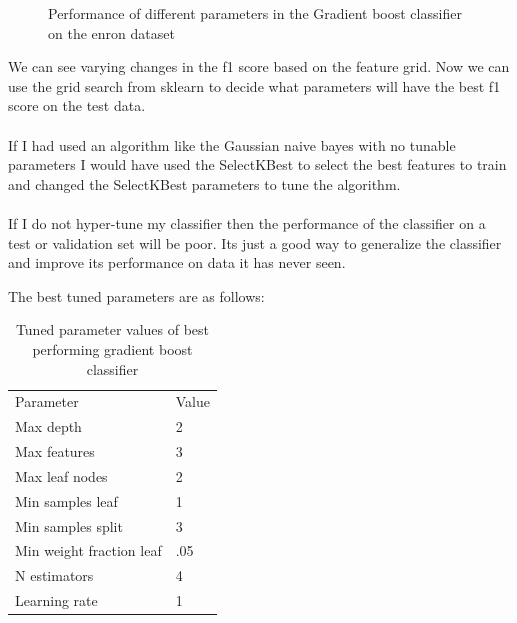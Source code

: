 \documentclass[12pt]{article}%
\begin{document}
\begin{figure}[!htbp]
\centering
  \caption{Performance of different parameters in the Gradient boost classifier on the enron dataset}
\end{figure}
We can see varying changes in the f1 score based on the feature grid. Now we can use the grid search from sklearn to decide what parameters will have the best f1 score on the test data.
\\
\\
If I had used an algorithm like the Gaussian naive bayes with no tunable parameters I would have used the SelectKBest to select the best features to train and changed the SelectKBest parameters to tune the algorithm.
\\
\\
If I do not hyper-tune my classifier then the performance of the classifier on a test or validation set will be poor. Its just a good way to generalize the classifier and improve its performance on data it has never seen.

The best tuned parameters are as follows:

\begin{table}[!htb]
\centering
\caption{Tuned parameter values of best performing gradient boost classifier}
\begin{tabular}{ll}
 Parameter & Value \\
 Max depth & 2 \\
 Max features & 3 \\
 Max leaf nodes & 2 \\
 Min samples leaf & 1 \\
 Min samples split & 3 \\
 Min weight fraction leaf & .05 \\
 N estimators & 4 \\
 Learning rate & 1 \\ 
 
\end{tabular}
\end{table}
\end{document}
